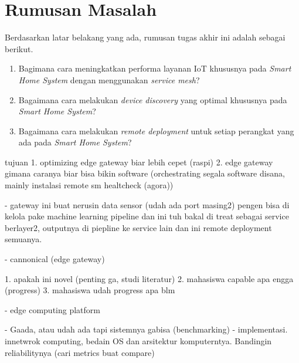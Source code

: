 \section{Rumusan Masalah}

Berdasarkan latar belakang yang ada, rumusan tugas akhir ini adalah sebagai berikut.
\begin{enumerate}
  \item Bagimana cara meningkatkan performa layanan IoT khususnya pada \textit{Smart Home System} dengan menggunakan \textit{service mesh}?
  \item Bagaimana cara melakukan \textit{device discovery} yang optimal khususnya pada \textit{Smart Home System}?
  \item Bagaimana cara melakukan \textit{remote deployment} untuk setiap perangkat yang ada pada \textit{Smart Home System}?
\end{enumerate}


tujuan
1. optimizing edge gateway biar lebih cepet (raspi)
2. edge gateway gimana caranya biar bisa bikin software (orchestrating segala software disana, mainly instalasi remote sm healtcheck (agora))

- gateway ini buat nerusin data sensor (udah ada port masing2) pengen bisa di kelola pake machine learning pipeline dan ini tuh bakal di treat sebagai service berlayer2, outputnya di piepline ke service lain dan ini remote deployment semuanya.

- cannonical (edge gateway)

1. apakah ini novel (penting ga, studi literatur)
2. mahasiswa capable apa engga (progress)
3. mahasiswa udah progress apa blm

- edge computing platform

- Gaada, atau udah ada tapi sistemnya gabisa (benchmarking)
- implementasi. innetwrok computing, bedain OS dan arsitektur komputerntya. Bandingin reliabilitynya (cari metrics buat compare)